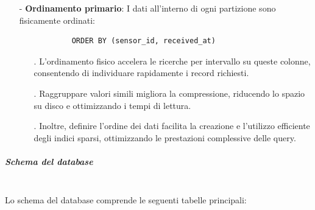 \documentclass[10pt]{article}
\newcommand{\mysubparagraph}[1]{\subparagraph{#1}\mbox{}\\}
\begin{document}
\begin{itemize}
            \item[-] \textbf{Ordinamento primario}: I dati all’interno di ogni partizione sono fisicamente ordinati:
            \begin{lstlisting}
            ORDER BY (sensor_id, received_at)
            \end{lstlisting}
            \begin{itemize}
                \item[.] L'ordinamento fisico accelera le ricerche per intervallo su queste colonne, consentendo di individuare rapidamente i record richiesti.
                \item[.] Raggruppare valori simili migliora la compressione, riducendo lo spazio su disco e ottimizzando i tempi di lettura.
                \item[.] Inoltre, definire l’ordine dei dati facilita la creazione e l’utilizzo efficiente degli indici sparsi, ottimizzando le prestazioni complessive delle query.
            \end{itemize}         
        \end{itemize}

        \mysubparagraph{Schema del database}
        Lo schema del database comprende le seguenti tabelle principali:
\end{document}
